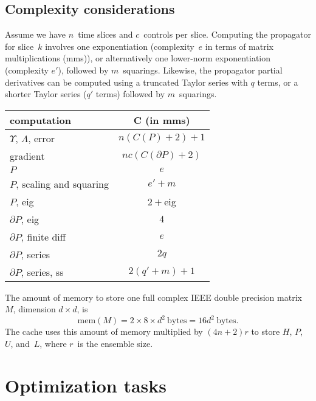 \documentclass[aps, pra, a4paper, longbibliography, superscriptaddress]{revtex4-1}
\newcommand{\be}{\begin{equation}}
\newcommand{\ee}{\end{equation}}
\newcommand{\spr}{\Upsilon}
\begin{document}
\subsection{Complexity considerations}

Assume we have $n$~time slices and $c$~controls per slice.
Computing the propagator for slice~$k$ involves
one exponentiation (complexity~$e$ in terms of matrix multiplications (mms)),
or alternatively one lower-norm exponentiation (complexity $e'$), followed by $m$~squarings.
Likewise, the propagator partial derivatives can be computed using a truncated Taylor series
with $q$ terms, or a shorter Taylor series ($q'$ terms) followed by $m$~squarings.

\begin{table}[h]
\begin{tabular}{lc}
computation & C (in mms)\\
\hline
$\spr$, $\Lambda$, error & $n(C(P) +2)+1$\\
gradient & $nc(C(\partial P)+2)$\\
$P$ & $e$\\
$P$, scaling and squaring & $e'+m$\\
$P$, eig & $2+$eig \\
$\partial P$, eig & $4$\\
$\partial P$, finite diff & $e$\\
$\partial P$, series & $2q$\\
$\partial P$, series, ss & $2(q' +m)+1$
\end{tabular}
\end{table}

The amount of memory to store one full
complex IEEE double precision matrix~$M$, dimension $d\times d$, is
\be
\text{mem}(M) = 2 \times 8 \times d^2~\text{bytes} = 16 d^2~\text{bytes}.
\ee
The cache uses this amount of memory multiplied by $(4n + 2)r$ to store $H$, $P$, $U$, and~$L$,
where $r$~is the ensemble size.

\section{Optimization tasks}
\end{document}
